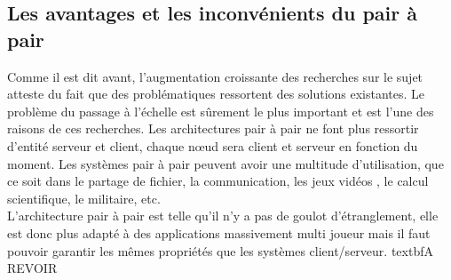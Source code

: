 	\subsection{Les avantages et les inconvénients du pair à pair}
	Comme il est dit avant, l'augmentation croissante des recherches sur le sujet atteste du fait que des problématiques ressortent des solutions existantes. Le problème du passage à l'échelle est sûrement le plus important et est l'une des raisons de ces recherches. Les architectures pair à pair ne font plus ressortir d'entité serveur et client, chaque nœud sera client et serveur en fonction du moment. Les systèmes pair à pair peuvent avoir une multitude d'utilisation, que ce soit dans le partage de fichier, la communication, les jeux vidéos , le calcul scientifique, le militaire, etc. \\
	L'architecture pair à pair est telle qu'il n'y a pas de goulot d'étranglement, elle est donc plus adapté à des applications massivement multi joueur mais il faut pouvoir garantir les mêmes propriétés que les systèmes client/serveur. textbf{A REVOIR}
 

